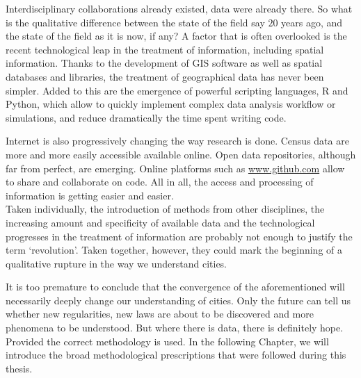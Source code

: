 Interdisciplinary collaborations already existed, data were already there. So
what is the qualitative difference between the state of the field say $20$ years
ago, and the state of the field as it is now, if any? A factor that is often
overlooked is the recent technological leap in the treatment of information,
including spatial information. Thanks to the development of GIS software as well
as spatial databases and libraries, the treatment of geographical data has never
been simpler. Added to this are the emergence of powerful scripting languages, R
and Python, which allow to quickly implement complex data analysis workflow or
simulations, and reduce dramatically the time spent writing code. 

Internet is also progressively changing the way research is done. Census data
are more and more easily accessible available online. Open data repositories,
although far from perfect, are emerging. Online platforms such as
\url{www.github.com} allow to share and collaborate on code. All in all,
the access and processing of information is getting easier and easier.\\


Taken individually, the introduction of methods from other disciplines, the
increasing amount and specificity of available data and the technological
progresses in the treatment of information are probably not enough to justify
the term `revolution'. Taken together, however, they could mark the beginning of
a qualitative rupture in the way we understand cities.

It is too premature to conclude that the convergence of the aforementioned will
necessarily deeply change our understanding of cities. Only the future can tell
us whether new regularities, new laws are about to be discovered and more
phenomena to be understood. But where there is data, there is definitely hope.
Provided the correct methodology is used. In the following Chapter, we will
introduce the broad methodological prescriptions that were followed during this
thesis.
